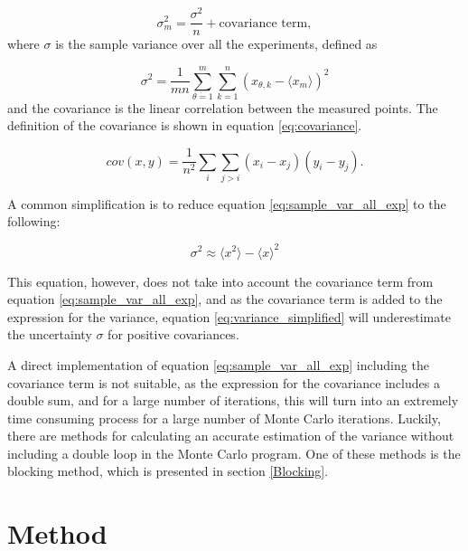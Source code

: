 \documentclass[norsk,a4paper,12pt]{article}
\begin{document}
\begin{equation}
\label{eq:sample_var_all_exp}
\sigma_m^2 = \frac{\sigma^2}{n} + \text{covariance term},
\end{equation}
where $\sigma$ is the sample variance over all the experiments, defined as 

\begin{equation}
\sigma^2 = \frac{1}{mn} \sum_{\theta=1}^m \sum_{k=1}^n (x_{\theta, k} - \langle x_m \rangle )^2
\end{equation}
and the covariance is the linear correlation between the measured points. The definition of the covariance is shown in equation \ref{eq:covariance}.

\begin{equation}
\label{eq:covariance}
cov(x,y) = \frac{1}{n^2} \sum_i \sum_{j >i} (x_i - x_j) (y_i - y_j).
\end{equation}

A common simplification is to reduce equation \ref{eq:sample_var_all_exp} to the following:

\begin{equation}
\label{eq:variance_simplified}
\sigma^2 \approx \langle x^2 \rangle - \langle x \rangle^2
\end{equation}

This equation, however, does not take into account the covariance term from equation \ref{eq:sample_var_all_exp}, and as the covariance term is added to the expression for the variance, equation \ref{eq:variance_simplified} will underestimate the uncertainty $\sigma$ for positive covariances.

A direct implementation of equation \ref{eq:sample_var_all_exp} including the covariance term is not suitable, as the expression for the covariance includes a double sum, and for a large number of iterations, this will turn into an extremely time consuming process for a large number of Monte Carlo iterations. Luckily, there are methods for calculating an accurate estimation of the variance without including a double loop in the Monte Carlo program. One of these methods is the blocking method, which is presented in section \ref{Blocking}.

\section{Method} \label{Method}
\end{document}
